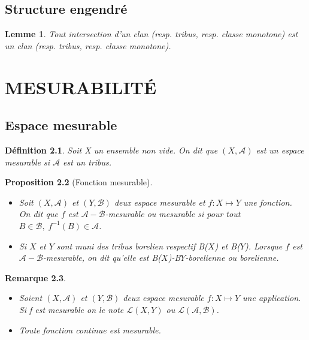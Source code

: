 \documentclass[a4paper,12pt,french]{report}
\theoremstyle{break}
\newtheorem{defin}{Définition}[section]
\newtheorem{prop}[defin]{Proposition}
\newtheorem{lemme}[defin]{Lemme}
\newtheorem{rema}[defin]{Remarque}
\begin{document}
\section{Structure engendré}
\begin{lemme}
         Tout intersection d'un clan (resp. tribus, resp. classe monotone) est un clan (resp. tribus, resp. classe monotone).
\end{lemme}

\chapter{MESURABILITÉ}
\section{Espace mesurable}
\begin{defin}
       Soit X un ensemble non vide. On dit que $(X,\mathcal{A})$ est un espace mesurable si $\mathcal{A}$ est un tribus.
\end{defin}

\begin{prop}[Fonction mesurable]
       \begin{itemize}
              \item Soit $(X, \mathcal{A})$ et $(Y, \mathcal{B})$ deux espace mesurable et $f : X \mapsto Y$ une fonction.\\ On dit que $f$ est $\mathcal{A}-\mathcal{B}$-mesurable ou mesurable si pour tout $B \in \mathcal{B}, \; f^{-1}(B) \in \mathcal{A}$.
              \item Si $X$ et $Y$ sont muni des tribus borelien respectif \textit{B}($X$) et \textit{B}($Y$). Lorsque $f$ est $\mathcal{A}-\mathcal{B}$-mesurable, on dit qu'elle est \textit{B}($X$)-\textit{B}{$Y$}-borelienne ou borelienne.
       \end{itemize}
\end{prop}

\begin{rema}
       \begin{itemize}
              \item Soient $(X, \mathcal{A})$ et $(Y, \mathcal{B})$ deux espace mesurable $f : X \mapsto Y$ une application. Si f est mesurable on le note $\mathcal{L}(X,Y)$ ou $\mathcal{L}(\mathcal{A}, \mathcal{B})$. 
              \item Toute fonction continue est mesurable.
       \end{itemize}
\end{rema}
\end{document}
